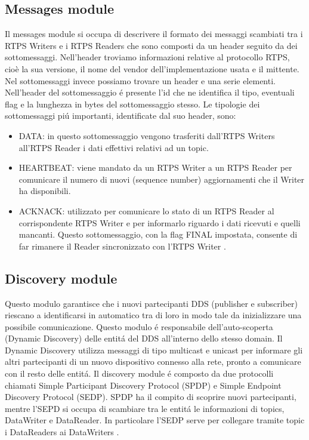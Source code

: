 \subsection{Messages module}
Il messages module si occupa di descrivere il formato dei messaggi scambiati
tra i RTPS Writers e i RTPS Readers che sono composti da un header
seguito da dei sottomessaggi. Nell'header troviamo informazioni relative al
protocollo RTPS, cioè la sua versione, il nome del vendor dell'implementazione
usata e il mittente. Nel sottomessaggi invece possiamo trovare un header
e una serie elementi. Nell'header del sottomessaggio
é presente l'id che ne
identifica il tipo, eventuali flag e la lunghezza in bytes 
del sottomessaggio stesso. Le tipologie dei sottomessaggi piú importanti, 
identificate dal suo header, sono:
\begin{itemize}
    \item DATA: in questo sottomessaggio vengono trasferiti dall'RTPS Writers
    all'RTPS Reader i dati effettivi relativi ad un topic.
    \item HEARTBEAT: viene mandato da un RTPS Writer a un RTPS Reader per 
    comunicare il numero di nuovi (sequence number) aggiornamenti che il 
    Writer ha disponibili.
    \item ACKNACK: utilizzato per comunicare lo stato di un RTPS Reader 
    al corrispondente RTPS Writer e per informarlo riguardo i dati ricevuti
    e quelli mancanti. Questo sottomessaggio, con la flag FINAL 
    impostata, consente di far rimanere il Reader sincronizzato con l'RTPS
    Writer \cite{ddsrtps}.
\end{itemize} \label{Messages module}


\subsection{Discovery module}
Questo modulo garantisce che i nuovi partecipanti DDS (publisher e subscriber)
riescano a identificarsi in automatico tra di loro in modo tale da inizializzare una 
possibile comunicazione. Questo modulo é responsabile dell'auto-scoperta 
(Dynamic Discovery)
delle entitá del DDS all'interno dello stesso domain. Il Dynamic Discovery
utilizza messaggi di tipo multicast e unicast per informare gli altri partecipanti
di un nuovo dispositivo connesso alla rete, pronto a comunicare con il
resto delle entitá. Il discovery module é composto da due protocolli chiamati
Simple Participant Discovery Protocol (SPDP) e 
Simple Endpoint Discovery Protocol (SEDP). SPDP ha il compito di scoprire nuovi 
partecipanti, mentre l'SEPD si occupa di scambiare tra le entitá le informazioni
di topics, DataWriter e DataReader. In particolare l'SEDP serve per collegare
tramite topic i DataReaders ai DataWriters \cite{ddsrtps}.
\label{Discovery module}

